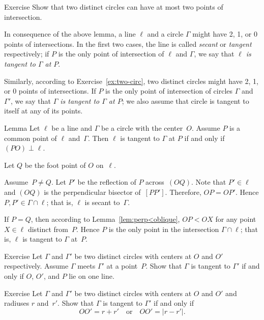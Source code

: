 \begin{thm}{Exercise}\label{ex:two-circ}
Show that two distinct circles can have at most two points of intersection.
\end{thm}

In consequence of the above lemma, 
a line $\ell$ and a circle $\Gamma$ might have 2, 1, or 0 points of intersections.
In the first two cases, the line is called \emph{secant} or \emph{tangent} respectively;
if $P$ is the only point of intersection of $\ell$ and $\Gamma$,
we say that {}\emph{$\ell$ is tangent to $\Gamma$ at $P$}. 

Similarly, according to Exercise~\ref{ex:two-circ},
two distinct circles might have 2, 1, or 0 points of intersections.
If $P$ is the only point of intersection of circles $\Gamma$ and $\Gamma'$,
we say that \emph{$\Gamma$ is tangent to $\Gamma$ at $P$}; we also assume that circle is tangent to itself at any of its points.

\begin{thm}[\abs]{Lemma}\label{lem:tangent}
Let $\ell$ be a line and $\Gamma$ be a circle with the center~$O$.
Assume $P$ is a common point of $\ell$ and~$\Gamma$. 
Then $\ell$ is tangent to $\Gamma$ at $P$ if and only if $(PO)\perp \ell$.
\end{thm}

Let $Q$ be the foot point of $O$ on~$\ell$.

Assume~$P\ne Q$.
Let $P'$ be the reflection of $P$ across~$(OQ)$.
Note that $P'\in\ell$ and $(OQ)$ is the perpendicular bisector of~$[PP']$.
Therefore, $OP=OP'$.
Hence $P,P'\in \Gamma\cap \ell$;
that is, $\ell$ is secant to~$\Gamma$.

If $P=Q$, 
then according to Lemma~\ref{lem:perp<oblique},
$OP<OX$ for any point $X\in \ell$ distinct from~$P$.
Hence $P$ is the only point in the intersection $\Gamma\cap\ell$;
that is, $\ell$ is tangent to $\Gamma$ at~$P$. 
\qeds

\begin{thm}{Exercise}\label{ex:tangent-circles}
Let $\Gamma$ and $\Gamma'$ be two distinct circles with centers at $O$ and $O'$ respectively. 
Assume $\Gamma$ meets $\Gamma'$ at a point~$P$.
Show that $\Gamma$ is tangent to $\Gamma'$ if and only if $O$, $O'$, and $P$ lie on one line.
\end{thm}

\begin{thm}{Exercise}\label{ex:tangent-circles-2}
Let $\Gamma$ and $\Gamma'$ be two distinct circles with centers at $O$ and $O'$ and radiuses $r$ and~$r'$.
Show that $\Gamma$ is tangent to $\Gamma'$ if and only if
$$OO'=r+r'
\quad
\text{or}\quad
OO'=|r-r'|.$$

\end{thm}

